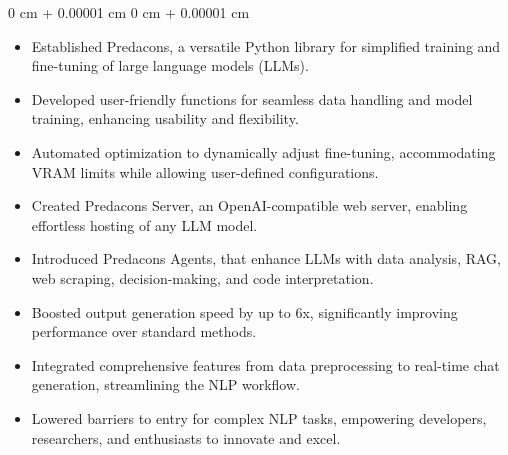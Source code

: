 \documentclass[10pt, letterpaper]{article}
\newenvironment{highlights}{
    \begin{itemize}[
        topsep=0.03 cm,
        parsep=0.02 cm,
        partopsep=0pt,
        itemsep=0pt,
        leftmargin=0 cm + 5pt
    ]
}{
    \end{itemize}
} %
\newenvironment{onecolentry}{
    \begin{adjustwidth}{
        0 cm + 0.00001 cm
    }{
        0 cm + 0.00001 cm
    }
}{
    \end{adjustwidth}
} %
\begin{document}
    \begin{onecolentry}
        \begin{adjustwidth}{0.4cm}{0cm}
            \begin{highlights}
                \item Established Predacons, a versatile Python library for simplified training and fine-tuning of large language models (LLMs).
                \item Developed user-friendly functions for seamless data handling and model training, enhancing usability and flexibility.
                \item Automated optimization to dynamically adjust fine-tuning, accommodating VRAM limits while allowing user-defined configurations.
                \item Created Predacons Server, an OpenAI-compatible web server, enabling effortless hosting of any LLM model.
                \item Introduced Predacons Agents, that enhance LLMs with data analysis, RAG, web scraping, decision-making, and code interpretation.
                \item Boosted output generation speed by up to 6x, significantly improving performance over standard methods.
                \item Integrated comprehensive features from data preprocessing to real-time chat generation, streamlining the NLP workflow.
                \item Lowered barriers to entry for complex NLP tasks, empowering developers, researchers, and enthusiasts to innovate and excel.
            \end{highlights}
        \end{adjustwidth}
    \end{onecolentry}
    
    
\end{document}
